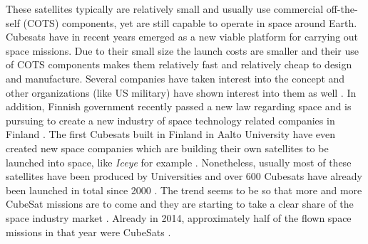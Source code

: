 \documentclass[english,12pt,a4paper,pdftex,elec,utf8]{aaltothesis}
\begin{document}
These satellites typically are relatively small and usually use commercial off-the-self (COTS) components, yet are still capable to operate in space around Earth. Cubesats have in recent years emerged as a new viable platform for carrying out space missions. Due to their small size the launch costs are smaller and their use of COTS components makes them relatively fast and relatively cheap to design and manufacture.  Several companies have taken interest into the concept and other organizations (like US military) have shown interest into them as well \cite{cds}. In addition, Finnish government recently passed a new law regarding space and is pursuing to create a new industry of space technology related companies in Finland \cite{filaw}. The first Cubesats built in Finland in Aalto University have even created new space companies which are building their own satellites to be launched into space, like \textit{Iceye} for example  \cite{iceye}. Nonetheless, usually most of these satellites have been produced by Universities and over 600 Cubesats have already been launched in total since 2000 \cite{Swart2017kalvo}. The trend seems to be so that more and more CubeSat missions are to come and they are starting to take a clear share of the space industry market \cite{SpaceWorks2017}. Already in 2014, approximately half of the flown space missions in that year were CubeSats \cite{Swart2016}.\par 
\end{document}
